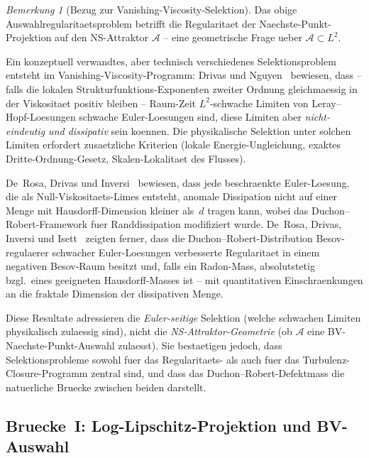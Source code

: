 \documentclass[12pt,a4paper]{article}
\theoremstyle{definition}
\theoremstyle{plain}
\theoremstyle{remark}
\newtheorem{remark}[definition]{Bemerkung}
\begin{document}
\begin{remark}[Bezug zur Vanishing-Viscosity-Selektion]
\label{rem:Drivas-VV-selection}
Das obige Auswahlregularitaetsproblem betrifft die Regularitaet der
Naechste-Punkt-Projektion auf den NS-Attraktor $\mathcal{A}$ -- eine
geometrische Frage ueber $\mathcal{A} \subset L^2$.

Ein konzeptuell verwandtes, aber technisch verschiedenes Selektionsproblem
entsteht im Vanishing-Viscosity-Programm: Drivas und
Nguyen~\cite{DrivasNguyen2019} bewiesen, dass -- falls die lokalen
Strukturfunktions-Exponenten zweiter Ordnung gleichmaessig in der
Viskositaet positiv bleiben -- Raum-Zeit $L^2$-schwache Limiten von
Leray--Hopf-Loesungen schwache Euler-Loesungen sind, diese Limiten
aber \emph{nicht-eindeutig und dissipativ} sein koennen.
Die physikalische Selektion unter solchen Limiten erfordert
zusaetzliche Kriterien (lokale Energie-Ungleichung, exaktes
Dritte-Ordnung-Gesetz, Skalen-Lokalitaet des Flusses).

De~Rosa, Drivas und Inversi~\cite{DeRosaDrivasInversi2024} bewiesen, dass jede
beschraenkte Euler-Loesung, die als Null-Viskositaets-Limes entsteht, anomale
Dissipation nicht auf einer Menge mit Hausdorff-Dimension kleiner als~$d$
tragen kann, wobei das Duchon--Robert-Framework fuer Randdissipation
modifiziert wurde.
De~Rosa, Drivas, Inversi und Isett~\cite{DeRosaDrivasInversiIsett2025}
zeigten ferner, dass die Duchon--Robert-Distribution Besov-regulaerer
schwacher Euler-Loesungen verbesserte Regularitaet in einem negativen
Besov-Raum besitzt und, falls ein Radon-Mass, absolutstetig bzgl.\ eines
geeigneten Hausdorff-Masses ist -- mit quantitativen Einschraenkungen an
die fraktale Dimension der dissipativen Menge.

Diese Resultate adressieren die \emph{Euler-seitige} Selektion (welche
schwachen Limiten physikalisch zulaessig sind), nicht die
\emph{NS-Attraktor-Geometrie} (ob $\mathcal{A}$ eine BV-Naechste-Punkt-Auswahl
zulaesst). Sie bestaetigen jedoch, dass Selektionsprobleme sowohl fuer das
Regularitaets- als auch fuer das Turbulenz-Closure-Programm zentral sind,
und dass das Duchon--Robert-Defektmass die natuerliche Bruecke zwischen
beiden darstellt.
\end{remark}


\subsection*{Bruecke~I: Log-Lipschitz-Projektion und BV-Auswahl}
\end{document}
